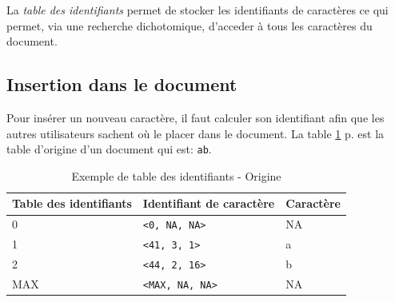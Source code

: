 		La \emph{table des identifiants} permet de stocker les identifiants de
		caractères ce qui permet, via une recherche dichotomique, d'acceder à
		tous les caractères du document.
		
	\subsection{Insertion dans le document}
	
		Pour insérer un nouveau caractère, il faut calculer son identifiant afin
		que les autres utilisateurs sachent où le placer dans le document. La
		table \ref{tab:tableID}	p.\pageref{tab:tableID} est la table d'origine
		d'un document qui est:
		\verb+ab+.\\
		\begin{table}
			\center
			\begin{tabular}{|l|l|l|}			
			\hline
				Table des identifiants & Identifiant de caractère & Caractère\\
			\hline
				0 & \verb+<0, NA, NA>+ & NA\\
				1 & \verb+<41, 3, 1>+ & a\\
				2 & \verb+<44, 2, 16>+ & b\\
				MAX & \verb+<MAX, NA, NA>+ & NA\\
			\hline
			\end{tabular}
			\caption{Exemple de table des identifiants - Origine}
			\label{tab:tableID}
		\end{table}
		
